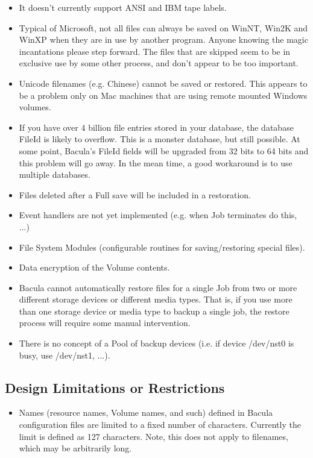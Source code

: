 \begin{itemize}
\item It doesn't currently support ANSI and IBM tape labels.  
\item Typical of Microsoft, not all files can always be saved on WinNT,  Win2K
   and WinXP when they are in use by another program.  Anyone knowing the magic
   incantations please step  forward. The files that are skipped seem to be in
   exclusive use  by some other process, and don't appear to be too important.  
\item Unicode filenames (e.g. Chinese) cannot be saved or restored.  This
   appears to be a problem  only on Mac machines that are using remote mounted
   Windows  volumes. 
\item If you have over 4 billion file entries stored in your database,  the
   database FileId is likely to overflow. This is a monster database,  but still
   possible. At some point, Bacula's FileId fields will be  upgraded from 32 bits
   to 64 bits and this problem will go away. In  the mean time, a good workaround
   is to use multiple databases.  
\item Files deleted after a Full save will be included in a restoration.  
\item Event handlers are not yet implemented (e.g. when Job terminates  do
   this, ...)  
\item File System Modules (configurable routines for saving/restoring special
   files).  
\item Data encryption of the Volume contents.  
\item Bacula cannot automatically restore files for a single Job
   from two or more different storage devices or different media types.
   That is, if you use more than one storage device or media type to
   backup a single job, the restore process will require some manual
   intervention.
\item There is no concept of a Pool of backup devices (i.e. if  device
   /dev/nst0 is busy, use /dev/nst1, ...). 
   \end{itemize}

\subsection*{Design Limitations or Restrictions}

\begin{itemize}
\item Names (resource names, Volume names, and such) defined in Bacula 
   configuration files are limited to a fixed number of characters.  Currently
   the limit is defined as 127 characters. Note, this does  not apply to
   filenames, which may be arbitrarily long. 
\end{itemize}
